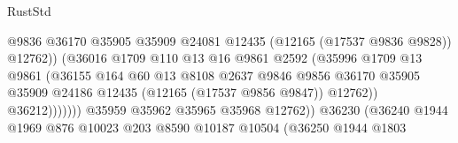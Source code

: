 \begin{lexlean}{RustStd}
\begin{coremodule}
                                                @9836
                                                @36170
                                                @35905
                                                @35909
                                                @24081
                                                @12435
                                                (@12165 (@17537 @9836 @9828))
                                                @12762))
                                            (@36016
                                              @1709
                                              @110
                                              @13
                                              @16
                                              @9861
                                              @2592
                                              (@35996
                                                @1709
                                                @13
                                                @9861
                                                (@36155
                                                  @164
                                                  @60
                                                  @13
                                                  @8108
                                                  @2637
                                                  @9846
                                                  @9856
                                                  @36170
                                                  @35905
                                                  @35909
                                                  @24186
                                                  @12435
                                                  (@12165 (@17537 @9856 @9847))
                                                  @12762))
                                              @36212)))))))
                                @35959
                                @35962
                                @35965
                                @35968
                                @12762))
                            @36230
                            (@36240
                              @1944
                              @1969
                              @876
                              @10023
                              @203
                              @8590
                              @10187
                              @10504
                              (@36250
                                @1944
                                @1803

\end{coremodule}
\end{lexlean}
